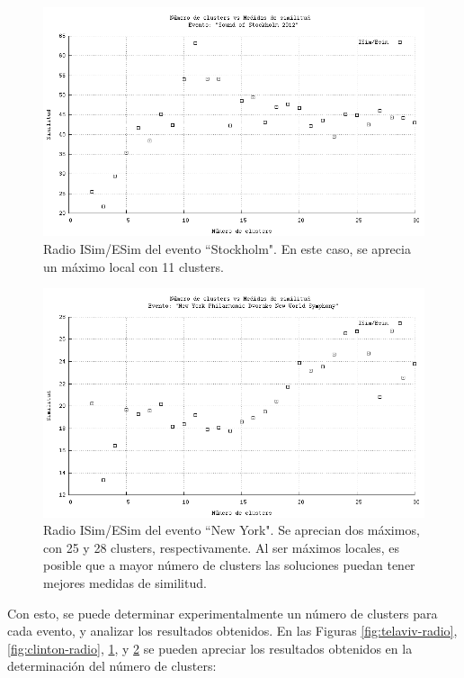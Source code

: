 \begin{figure}[h!]
  \centering
  \includegraphics[width=12cm]{./img/stockholm-clusters-radio.png}
  \caption[Radios de similitud para evento 3]
   { Radio ISim/ESim del evento ``Stockholm". En este caso, se aprecia un máximo local con 11 clusters.\label{fig:stockholm-radio}}
\end{figure}

\begin{figure}[h!]
  \centering
  \includegraphics[width=12cm]{./img/dvorak-clusters-radio.png}
  \caption[Radios de similitud para evento 4]
   { Radio ISim/ESim del evento ``New York". Se aprecian dos máximos, con 25 y 28 clusters, respectivamente. Al ser máximos locales, es posible que a mayor número de clusters las soluciones puedan tener mejores medidas de similitud. \label{fig:dvorak-radio} }
\end{figure}

Con esto, se puede determinar experimentalmente un número de clusters
para cada evento, y analizar los resultados obtenidos. En las Figuras \ref{fig:telaviv-radio}, \ref{fig:clinton-radio}, \ref{fig:stockholm-radio}, y \ref{fig:dvorak-radio} se pueden apreciar los resultados obtenidos en la determinación del número de clusters:

